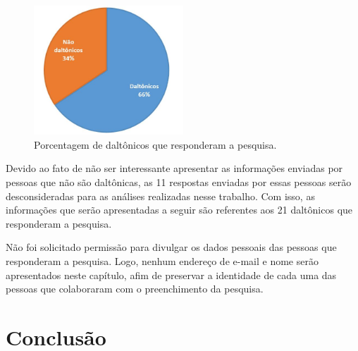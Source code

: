 \documentclass[	12pt, Times, openright, twoside, a4paper, english, brazil]{abntex2}
\begin{document}
\begin{figure}[!htb]
\centering \includegraphics[width=0.5\textwidth]{figuraPorcentagemDaltonicos.jpg}
\caption{Porcentagem de daltônicos que responderam a pesquisa.} \label{fig:figuraPorcentagemDaltonicos}
\end{figure}

Devido ao fato de não ser interessante apresentar as informações enviadas por pessoas que não são daltônicas, as 11 respostas enviadas por essas pessoas serão desconsideradas para as análises realizadas nesse trabalho. Com isso, as informações que serão apresentadas a seguir são referentes aos 21 daltônicos que responderam a pesquisa.

Não foi solicitado permissão para divulgar os dados pessoais das pessoas que responderam a pesquisa. Logo, nenhum endereço de e-mail e nome serão apresentados neste capítulo, afim de preservar a identidade de cada uma das pessoas que colaboraram com o preenchimento da pesquisa.



\chapter{Conclusão}
\postextual


%


%
%

\end{document}
